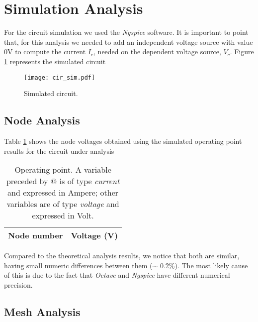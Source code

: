 \section{Simulation Analysis}
\label{sec:simulation}

For the circuit simulation we used the \textit{Ngspice} software. It is important to point that, for this analysis we needed to add an independent voltage source with value 0V to compute the current $I_c$, needed on the dependent voltage source, $V_c$. Figure \ref{fig:cir_sim} represents the simulated circuit

\begin{figure}[H] \centering
\texttt{[image: cir\_sim.pdf]}
\caption{Simulated circuit.}
\label{fig:cir_sim}
\end{figure}

\subsection{Node Analysis}
\label{subsec:node_sim}

Table \ref{tab:node_sim} shows the node voltages obtained using the simulated operating point results for the circuit under analysis
\begin{table}[H]
  \centering
  \begin{tabular}{|l|r|}
    \hline    
    {\bf Node number} & {\bf Voltage (V)} \\ \hline
    
  \end{tabular}
  \caption{Operating point. A variable preceded by @ is of type {\em current}
    and expressed in Ampere; other variables are of type {\it voltage} and expressed in
    Volt.}
  \label{tab:node_sim}
\end{table}
Compared to the theoretical analysis results, we notice that both are similar, having small numeric differences between them ($\sim$ 0.2\%). The most likely cause of this is due to the fact that \textit{Octave} and \textit{Ngspice} have different numerical precision.

\subsection{Mesh Analysis}

